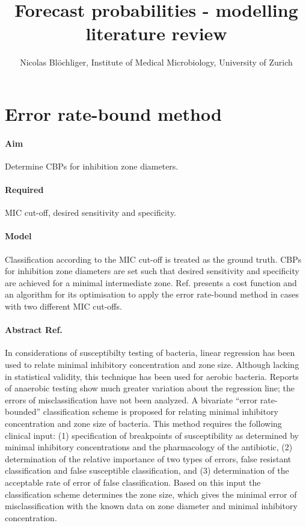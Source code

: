 \documentclass[a4paper]{article}
\title{Forecast probabilities - modelling literature review}
\author{Nicolas Blöchliger, Institute of Medical Microbiology, University of Zurich}
\begin{document}
\maketitle
\tableofcontents

\section{Error rate-bound method \cite{Metzler1974}}

\paragraph{Aim} Determine CBPs for inhibition zone diameters.
\paragraph{Required} MIC cut-off, desired sensitivity and specificity.
\paragraph{Model} Classification according to the MIC cut-off is treated as the ground truth. CBPs for inhibition zone diameters are set such that desired sensitivity and specificity are achieved for a minimal intermediate zone. Ref. \cite{Brunden1992} presents a cost function and an algorithm for its optimisation to apply the error rate-bound method in cases with two different MIC cut-offs.

\paragraph{Abstract Ref.~\cite{Metzler1974}} In considerations of susceptibilty testing of bacteria, linear regression has been used to relate minimal inhibitory concentration and zone size. Although lacking in statistical validity, this technique has been used for aerobic bacteria. Reports of anaerobic testing show much greater variation about the regression line; the errors of misclassification have not been analyzed. A bivariate “error rate-bounded” classification scheme is proposed for relating minimal inhibitory concentration and zone size of bacteria. This method requires the following clinical input: (1) specification of breakpoints of susceptibility as determined by minimal inhibitory concentrations and the pharmacology of the antibiotic, (2) determination of the relative importance of two types of errors, false resistant classification and false susceptible classification, and (3) determination of the acceptable rate of error of false classification. Based on this input the classification scheme determines the zone size, which gives the minimal error of misclassification with the known data on zone diameter and minimal inhibitory concentration.
\end{document}
